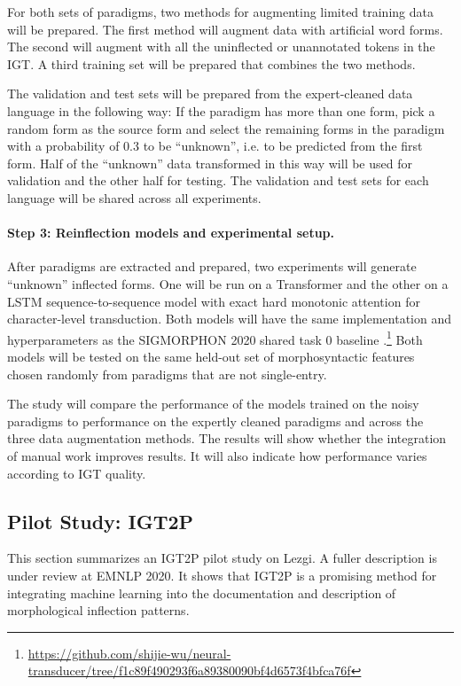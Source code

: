 For both sets of paradigms, two methods for augmenting limited training data will be prepared. The first method will augment data with artificial word forms. The second will augment with all the uninflected or unannotated tokens in the IGT. A third training set will be prepared that combines the two methods.

The validation and test sets will be prepared from the expert-cleaned data language in the following way: If the paradigm has more than one form, pick a random form as the source form and select the remaining forms in the paradigm with a probability of 0.3 to be ``unknown'', i.e. to be predicted from the first form. Half of the ``unknown'' data transformed in this way will be used for validation and the other half for testing. The validation and test sets for each language will be shared across all experiments.
 
\paragraph{Step 3: Reinflection models and experimental setup.}
After paradigms are extracted and prepared, two experiments will generate ``unknown'' inflected forms. One will be run on a Transformer and the other on a LSTM sequence-to-sequence model with exact hard monotonic attention for character-level transduction. Both models will have the same implementation and hyperparameters as the SIGMORPHON 2020 shared task 0 baseline \cite{vylomova2020sigmorphon}.\footnote{\url{https://github.com/shijie-wu/neural-transducer/tree/f1c89f490293f6a89380090bf4d6573f4bfca76f}} Both models will be tested on the same held-out set of morphosyntactic features chosen randomly from paradigms that are not single-entry. 

The study will compare the performance of the models trained on the noisy paradigms to performance on the expertly cleaned paradigms and across the three data augmentation methods. The results will show whether the integration of manual work improves results. It will also indicate how performance varies according to IGT quality.  

\subsection{Pilot Study: IGT2P}
\label{sec:pilotIGT2P}

This section summarizes an IGT2P pilot study on Lezgi. A fuller description is under review at EMNLP 2020. It shows that IGT2P is a promising method for integrating machine learning into the documentation and description of morphological inflection patterns.

